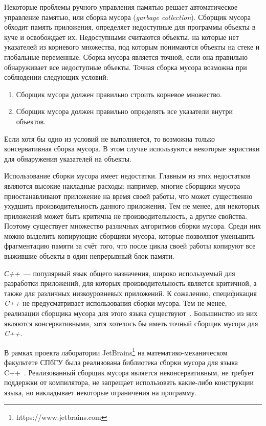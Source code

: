 Некоторые проблемы ручного управления памятью решает автоматическое управление памятью, или сборка мусора (\textit{garbage collection}). 
Сборщик мусора обходит память приложения, определяет недоступные для программы
объекты в куче и освобождает их. Недоступными считаются объекты, на которые нет указателей из корневого множества, под которым понимаются объекты на стеке и глобальные переменные. Сборка мусора является точной, если она правильно обнаруживает все недоступные объекты. Точная сборка мусора возможна при соблюдении следующих условий:
\begin{enumerate}
\item{Сборщик мусора должен правильно строить корневое множество.}
\item{Сборщик мусора должен правильно определять все указатели внутри объектов.}
\end{enumerate}
Если хотя бы одно из условий не выполняется, то возможна только консервативная сборка мусора. В этом случае используются некоторые эвристики для 
обнаружения указателей на объекты.

Использование сборки мусора имеет недостатки. Главным из этих недостатков являются
высокие накладные расходы: например, многие сборщики мусора приостанавливают приложение
на время своей работы, что может существенно ухудшить производительность данного приложения. Тем не менее, для некоторых приложений может быть критична не производительность, а другие свойства. Поэтому
существует множество различных алгоритмов сборки мусора. Среди них можно выделить копирующие сборщики мусора, которые позволяют уменьшить фрагментацию памяти за счёт того, что после цикла своей работы копируют все выжившие объекты в один непрерывный блок памяти.

\textit{С++}~--- популярный язык общего назначения, широко используемый
для разработки приложений, для которых производительность является критичной, а 
также для различных низкоуровневых приложений. К сожалению, спецификация \textit{C++} не предусматривает использования сборки мусора. Тем не менее, реализации сборщика мусора
для этого языка существуют~\cite{mcc1, boehm1}. Большинство из них являются консервативными, хотя хотелось 
бы иметь точный сборщик мусора для \textit{C++}.

В рамках проекта лаборатории JetBrains\footnote{https://www.jetbrains.com} на математико-механическом факультете СПбГУ
была реализована библиотека сборки мусора для языка C++~\cite{berezun}. 
Реализованный сборщик мусора является неконсервативным, не требует поддержки от компилятора, не запрещает использовать какие-либо конструкции языка, но накладывает некоторые ограничения на программу.


